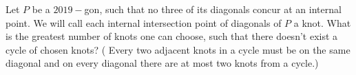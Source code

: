 Let $P$ be a $2019-$gon, such that no three of its diagonals concur at an internal point. We will call each internal intersection point of diagonals of $P$ a knot. What is the greatest number of knots one can choose, such that there doesn't exist a cycle of chosen knots? ( Every two adjacent knots in a cycle must be on the same diagonal and on every diagonal there are at most two knots from a cycle.)